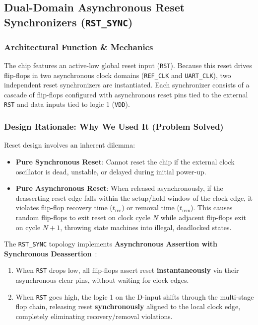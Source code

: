 \documentclass[11pt,a4paper]{article}
\begin{document}
\subsection{Dual-Domain Asynchronous Reset Synchronizers (\texttt{RST\_SYNC})}

\subsubsection{Architectural Function \& Mechanics}
The chip features an active-low global reset input (\texttt{RST}). Because this reset drives flip-flops in two asynchronous clock domains (\texttt{REF\_CLK} and \texttt{UART\_CLK}), two independent reset synchronizers are instantiated. Each synchronizer consists of a cascade of flip-flops configured with asynchronous reset pins tied to the external \texttt{RST} and data inputs tied to logic 1 (\texttt{VDD}).

\subsubsection{Design Rationale: Why We Used It (Problem Solved)}
Reset design involves an inherent dilemma:
\begin{itemize}
    \item \textbf{Pure Synchronous Reset}: Cannot reset the chip if the external clock oscillator is dead, unstable, or delayed during initial power-up.
    \item \textbf{Pure Asynchronous Reset}: When released asynchronously, if the deasserting reset edge falls within the setup/hold window of the clock edge, it violates flip-flop recovery time ($t_{\text{rec}}$) or removal time ($t_{\text{rem}}$). This causes random flip-flops to exit reset on clock cycle $N$ while adjacent flip-flops exit on cycle $N+1$, throwing state machines into illegal, deadlocked states.
\end{itemize}
The \texttt{RST\_SYNC} topology implements \textbf{Asynchronous Assertion with Synchronous Deassertion}~\cite{cummings_reset}:
\begin{enumerate}
    \item When \texttt{RST} drops low, all flip-flops assert reset \textbf{instantaneously} via their asynchronous clear pins, without waiting for clock edges.
    \item When \texttt{RST} goes high, the logic 1 on the D-input shifts through the multi-stage flop chain, releasing reset \textbf{synchronously} aligned to the local clock edge, completely eliminating recovery/removal violations.
\end{enumerate}
\end{document}
